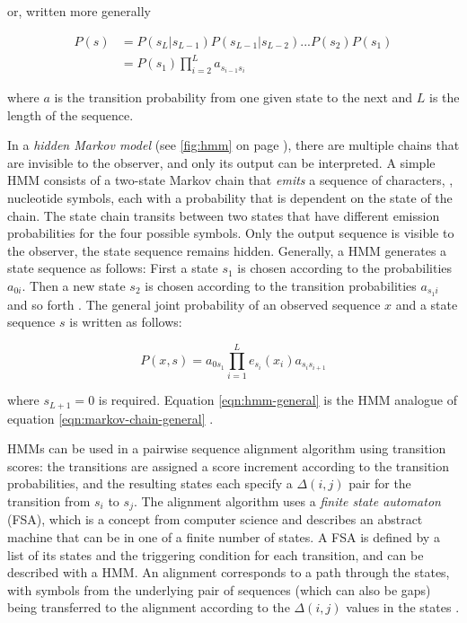 or, written more generally

\begin{equation}
	\begin{split}
		P(s) &= P(s_L|s_{L-1}) P(s_{L-1}|s_{L-2}) . . . P(s_2) P(s_1) \\
		&= P(s_1) \prod^{L}_{i=2}a_{s_{i-1}s_{i}}
	\end{split}
	\label{eqn:markov-chain-general}
\end{equation}

where $a$ is the transition probability from one given state to the next and $L$
is the length of the sequence.

In a \emph{hidden Markov model} (see \autoref{fig:hmm} on page \pageref{fig:hmm}), there are multiple chains that are invisible to
the observer, and only its output can be interpreted. A simple HMM consists of a
two-state Markov chain that \emph{emits} a sequence of characters, \eg, nucleotide
symbols, each with a probability that is dependent on the state of the chain. The state chain
transits between two states that have different emission probabilities for the
four possible symbols. Only the output sequence is visible to the observer, the
state sequence remains hidden.
Generally, a HMM generates a state sequence as follows: First a state $s_1$ is
chosen according to the probabilities $a_{0i}$. Then a new state $s_2$ is
chosen according to the transition probabilities $a_{s_{1}i}$ and so forth
\citep{durbin1998}. The general joint probability of an observed sequence $x$
and a state sequence $s$ is written as follows:

\begin{equation}
P(x,s) = a_{0s_1} \prod_{i=1}^L e_{s_i}(x_i)a_{s_is_{i+1}}
\label{eqn:hmm-general}
\end{equation}

where $s_{L+1} = 0$ is required. Equation \eqref{eqn:hmm-general} is the HMM
analogue of equation \eqref{eqn:markov-chain-general} \citep{durbin1998}.



HMMs can be used in a pairwise sequence alignment algorithm using transition
scores: the transitions are assigned a score increment according to the
transition probabilities, and the resulting states each specify a $\Delta(i,j)$
pair for the transition from $s_i$ to $s_j$. The alignment algorithm uses a
\emph{finite state automaton} (FSA), which is a concept from computer science
and describes an abstract machine that can be in one of a finite number of
states. A FSA is defined by a list of its states and the triggering condition
for each transition, and can be described with a HMM. An alignment corresponds
to a path through the states, with symbols from the underlying pair of
sequences (which can also be gaps) being transferred to the alignment according
to the $\Delta(i,j)$ values in the states \citep{durbin1998}. 

